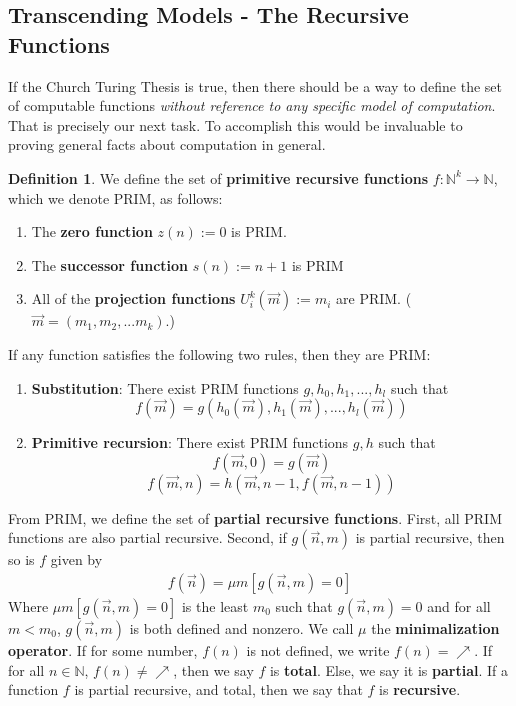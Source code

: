 \documentclass{article}
\theoremstyle{definition}
\newtheorem{definition}{Definition}[section]
\theoremstyle{plain}
\theoremstyle{theorem}
\begin{document}
\subsection{Transcending Models - The Recursive Functions}
\par If the Church Turing Thesis is true, then there should be a way to define the set of computable functions \textit{without reference to any specific model of computation}. That is precisely our next task. To accomplish this would be invaluable to proving general facts about computation in general.  
\begin{definition}
    We define the set of \textbf{primitive recursive functions} $f:\mathbb{N}^k \to \mathbb{N}$, which we denote PRIM, as follows:
    \begin{enumerate}
        \item The \textbf{zero function} $z(n):=0$ is PRIM.
        \item The \textbf{successor function} $s(n):=n+1$ is PRIM
        \item All of the \textbf{projection functions} $U_i^k(\vec{m}) := m_i$ are PRIM. ($\vec{m} = (m_1,m_2,...m_k)$.)
    \end{enumerate}
    If any function satisfies the following two rules, then they are PRIM:
    \begin{enumerate}
        \item \textbf{Substitution}: There exist PRIM functions $g,h_0,h_1,...,h_l$ such that 
            \[f(\vec{m})=g(h_0(\vec{m}),h_1(\vec{m}),...,h_l(\vec{m})) \]
        \item \textbf{Primitive recursion}: There exist PRIM functions $g,h$ such that
            \[f(\vec{m},0)=g(\vec{m})\]
            \[f(\vec{m},n)=h(\vec{m},n-1,f(\vec{m},n-1)) \]
    \end{enumerate}
    From PRIM, we define the set of \textbf{partial recursive functions}. First, all PRIM functions are also partial recursive. Second, if $g(\vec{n},m)$ is partial recursive, then so is $f$ given by
    \begin{align}
        f(\vec{n}) = \mu m[g(\vec{n},m)=0]
    \end{align}
    Where $\mu m[g(\vec{n},m)=0]$ is the least $m_0$ such that $g(\vec{n},m)=0$ and for all $m < m_0$, $g(\vec{n},m)$ is both defined and nonzero. We call $\mu$ the \textbf{minimalization operator}. If for some number, $f(n)$ is not defined, we write $f(n) = \nearrow$. If for all $n \in \mathbb{N}$, $f(n) \neq \nearrow$, then we say $f$ is \textbf{total}. Else, we say it is \textbf{partial}. If a function $f$ is partial recursive, and total, then we say that $f$ is \textbf{recursive}.  
\end{definition}
\end{document}
